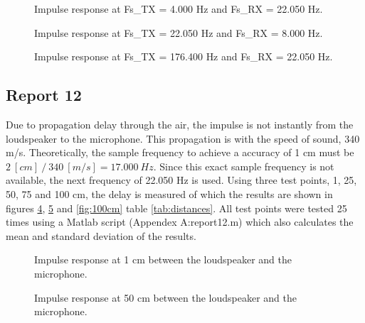 \documentclass[final]{scrreprt} %
\begin{document}
\begin{figure}[H]
	\centering
	\setlength\figureheight{4cm}
    	\setlength{}
	
	\caption{Impulse response at Fs\_TX = 4.000 Hz and Fs\_RX = 22.050 Hz.}
	\label{fig:response_2}
\end{figure}

\begin{figure}[H]
	\centering
	\setlength\figureheight{4cm}
    	\setlength{}
	
	\caption{Impulse response at Fs\_TX = 22.050 Hz and Fs\_RX = 8.000 Hz.}
	\label{fig:response_3}
\end{figure}

\begin{figure}[H]
	\centering
	\setlength\figureheight{4cm}
    	\setlength{}
	
	\caption{Impulse response at Fs\_TX = 176.400 Hz and Fs\_RX = 22.050 Hz.}
	\label{fig:highest_freq}
\end{figure}

\subsection{Report 12}
Due to propagation delay through the air, the impulse is not instantly from the loudspeaker to the microphone.
This propagation is with the speed of sound, 340 m/s.
Theoretically, the sample frequency to achieve a accuracy of 1 cm must be $2 ~[cm] ~/~ 340 ~[m/s] = 17.000 ~ Hz$.
Since this exact sample frequency is not available, the next frequency of 22.050 Hz is used.
Using three test points, 1, 25, 50, 75 and 100 cm, the delay is measured of which the results are shown in figures \ref{fig:1cm}, \ref{fig:50cm} and \ref{fig:100cm} table \ref{tab:distances}.
All test points were tested 25 times using a Matlab script (Appendex A:report12.m) which also calculates the mean and standard deviation of the results.

\begin{figure}[H]
	\centering
	\setlength\figureheight{4cm}
    	\setlength{}
	
	\caption{Impulse response at 1 cm between the loudspeaker and the microphone.}
	\label{fig:1cm}
\end{figure}

\begin{figure}[H]
	\centering
	\setlength\figureheight{4cm}
    	\setlength{}
	
	\caption{Impulse response at 50 cm between the loudspeaker and the microphone.}
	\label{fig:50cm}
\end{figure}
\end{document}
